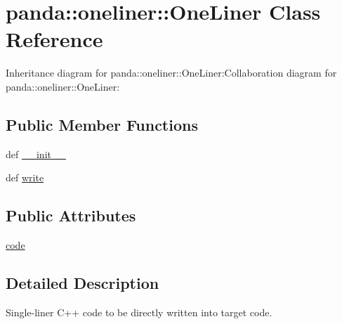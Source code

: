 \hypertarget{classpanda_1_1oneliner_1_1OneLiner}{
\section{panda::oneliner::OneLiner Class Reference}
\label{classpanda_1_1oneliner_1_1OneLiner}
}
Inheritance diagram for panda::oneliner::OneLiner:Collaboration diagram for panda::oneliner::OneLiner:\subsection*{Public Member Functions}
\begin{DoxyCompactItemize}
\item 
def \hyperlink{classpanda_1_1oneliner_1_1OneLiner_a1ed959b91d6a8bda7eeaa46e09857fc4}{\_\-\_\-init\_\-\_\-}
\item 
def \hyperlink{classpanda_1_1oneliner_1_1OneLiner_a43fa978a6b4ff7897b2155c8f92bad93}{write}
\end{DoxyCompactItemize}
\subsection*{Public Attributes}
\begin{DoxyCompactItemize}
\item 
\hyperlink{classpanda_1_1oneliner_1_1OneLiner_a8b607764372e2ee528f7cd605747ebbd}{code}
\end{DoxyCompactItemize}


\subsection{Detailed Description}
\begin{DoxyVerb}
Single-liner C++ code to be directly written into target code.
\end{DoxyVerb}
 


